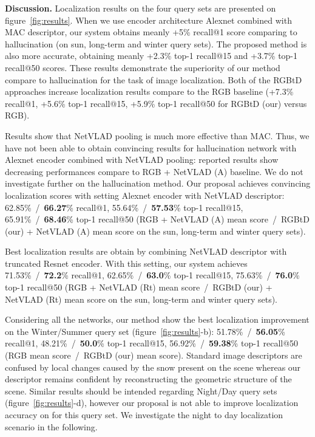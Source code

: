 \vspace{4pt}\noindent\textbf{Discussion.} Localization results on the four query sets are presented on figure~\ref{fig:results}.  When we use encoder architecture Alexnet combined with MAC descriptor, our system obtains meanly +5\% recall@1 score comparing to hallucination (on sun, long-term and winter query sets). The proposed method is also more accurate, obtaining meanly +2.3\% top-1 recall@15 and +3.7\% top-1 recall@50 scores. These results demonstrate the superiority of our method compare to hallucination for the task of image localization. Both of the RGBtD approaches increase localization results compare to the RGB baseline (+7.3\% recall@1, +5.6\% top-1 recall@15, +5.9\% top-1 recall@50 for RGBtD (our) versus RGB).

Results show that NetVLAD pooling is much more effective than MAC. Thus, we have not been able to obtain convincing results for hallucination network with Alexnet encoder combined with NetVLAD pooling: reported results show decreasing performances compare to RGB + NetVLAD (A) baseline. We do not investigate further on the hallucination method. Our proposal achieves convincing localization scores with setting Alexnet encoder with NetVLAD descriptor: 62.85\%~/~\textbf{66.27}\% recall@1, 55.64\%~/~\textbf{57.53}\% top-1 recall@15, 65.91\%~/~\textbf{68.46}\% top-1 recall@50  (RGB + NetVLAD (A) mean score~/~RGBtD (our) + NetVLAD (A) mean score on the sun, long-term and winter query sets).

Best localization results are obtain by combining NetVLAD descriptor with truncated Resnet encoder. With this setting, our system achieves 71.53\%~/~\textbf{72.2}\% recall@1, 62.65\%~/~\textbf{63.0}\% top-1 recall@15, 75.63\%~/~\textbf{76.0}\% top-1 recall@50  (RGB + NetVLAD (Rt) mean score~/~RGBtD (our) + NetVLAD (Rt) mean score on the sun, long-term and winter query sets).

Considering all the networks, our method show the best localization improvement on the Winter/Summer query set (figure~\ref{fig:results}-b): 51.78\%~/~\textbf{56.05}\% recall@1, 48.21\%~/~\textbf{50.0}\% top-1 recall@15, 56.92\%~/~\textbf{59.38}\% top-1 recall@50  (RGB mean score~/~RGBtD (our) mean score). Standard image descriptors are confused by local changes caused by the snow present on the scene whereas our descriptor remains confident by reconstructing the geometric structure of the scene. Similar results should be intended regarding Night/Day query sets (figure~\ref{fig:results}-d), however our proposal is not able to improve localization accuracy on for this query set. We investigate the night to day localization scenario in the following.

